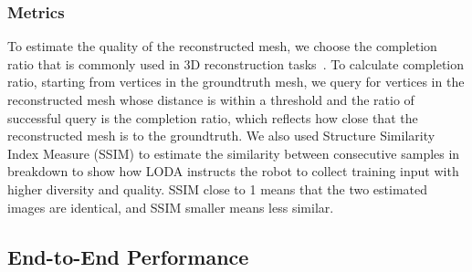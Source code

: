 \subsubsection{Metrics}
To estimate the quality of the reconstructed mesh, we choose the completion ratio that is commonly used in 3D reconstruction tasks~\cite{li2022bnvfusion,zhu_nice-slam_2022}.
To calculate completion ratio, starting from vertices in the groundtruth mesh, we query for vertices in the reconstructed mesh whose distance is within a threshold and the ratio of successful query is the completion ratio, which reflects how close that the reconstructed mesh is to the groundtruth.
We also used Structure Similarity Index Measure (SSIM) to estimate the similarity between consecutive samples in breakdown to show how LODA instructs the robot to collect training input with higher diversity and quality.
SSIM close to 1 means that the two estimated images are identical, and SSIM smaller means less similar.


\subsection{End-to-End Performance}
